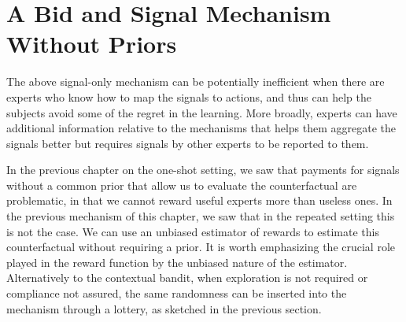 



	




\section{A Bid and Signal Mechanism Without Priors}



The above signal-only mechanism can be potentially inefficient when there are experts who know how to map the signals to actions, and thus can help the subjects avoid some of the regret in the learning.
More broadly, experts can have additional information relative to the mechanisms that helps them aggregate the signals better but requires signals by other experts to be reported to them. 

In the previous chapter on the one-shot setting, we saw that payments for signals without a common prior that allow us to evaluate the counterfactual are problematic, in that we cannot reward useful experts more than useless ones.
In the previous mechanism of this chapter, we saw that in the repeated setting this is not the case.
We can use an unbiased estimator of rewards to estimate this counterfactual without requiring a prior.
It is worth emphasizing the crucial role played in the reward function by the unbiased nature of the estimator.
Alternatively to the contextual bandit, when exploration is not required or compliance not assured, the same randomness can be inserted into the mechanism through a lottery, as sketched in the previous section.

